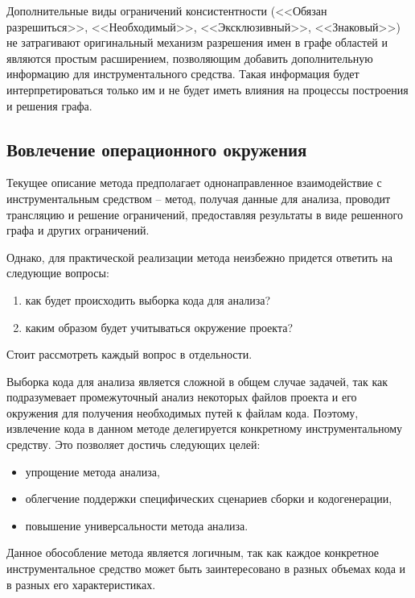 Дополнительные виды ограничений консистентности (<<Обязан разрешиться>>, <<Необходимый>>, <<Эксклюзивный>>, <<Знаковый>>) не затрагивают
оригинальный механизм разрешения имен в графе областей и являются простым расширением, позволяющим добавить
дополнительную информацию для инструментального средства. Такая информация будет интерпретироваться только
им и не будет иметь влияния на процессы построения и решения графа.

\subsection{Вовлечение операционного окружения}

Текущее описание метода предполагает однонаправленное взаимодействие с инструментальным средством -- метод,
получая данные для анализа, проводит трансляцию и решение ограничений, предоставляя результаты в виде решенного
графа и других ограничений.

Однако, для практической реализации метода неизбежно придется ответить на следующие вопросы:
\begin{enumerate}[1.]
    \item как будет происходить выборка кода для анализа?
    \item каким образом будет учитываться окружение проекта?
\end{enumerate}
Стоит рассмотреть каждый вопрос в отдельности.

Выборка кода для анализа является сложной в общем случае задачей, так как подразумевает
промежуточный анализ некоторых файлов проекта и его окружения для получения необходимых
путей к файлам кода. Поэтому, извлечение кода в данном методе делегируется конкретному инструментальному
средству. Это позволяет достичь следующих целей:
\begin{itemize}
    \item упрощение метода анализа,
    \item облегчение поддержки специфических сценариев сборки и кодогенерации,
    \item повышение универсальности метода анализа.
\end{itemize}

Данное обособление метода является логичным, так как каждое конкретное инструментальное
средство может быть заинтересовано в разных объемах кода и в разных его характеристиках.

